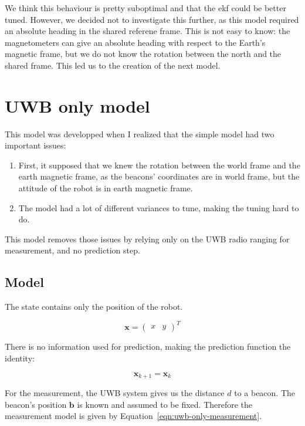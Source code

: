 \documentclass[a4paper, 12pt]{scrreprt}
\begin{document}
We think this behaviour is pretty suboptimal and that the \gls{ekf} could be better tuned.
However, we decided not to investigate this further, as this model required an absolute heading in the shared referene frame.
This is not easy to know: the magnetometers can give an absolute heading with respect to the Earth's magnetic frame, but we do not know the rotation between the north and the shared frame.
This led us to the creation of the next model.

\section{UWB only model}

This model was developped when I realized that the simple model had two important issues:

\begin{enumerate}
\item First, it supposed that we knew the rotation between the world frame and the earth magnetic frame, as the beacons' coordinates are in world frame, but the attitude of the robot is in earth magnetic frame.
\item The model had a lot of different variances to tune, making the tuning hard to do.
\end{enumerate}

This model removes those issues by relying only on the UWB radio ranging for measurement, and no prediction step.

\subsection{Model}

The state contains only the position of the robot.

\begin{equation*}
\mathbf{x} = \begin{pmatrix}x & y\end{pmatrix}^T
\end{equation*}


There is no information used for prediction, making the prediction function the identity:

\begin{equation}
\mathbf{x}_{k+1} = \mathbf{x}_{k}
\end{equation}

For the measurement, the UWB system gives us the distance $d$ to a beacon. The beacon's position $\mathbf{b}$ is known and assumed to be fixed.
Therefore the measurement model is given by Equation~\ref{eqn:uwb-only-measurement}.
\end{document}
